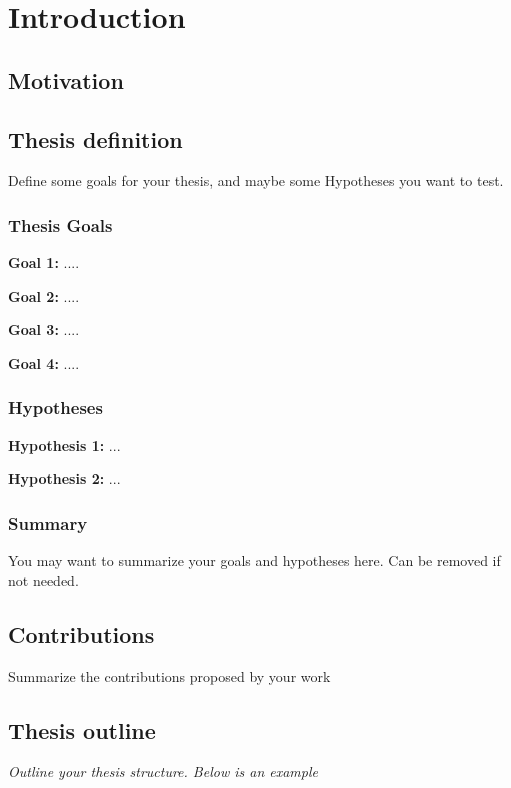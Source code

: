 \documentclass{uia}
\begin{document}
\chapter{Introduction}
\section{Motivation}

\section{Thesis definition}
\label{sec:intro:definition}
Define some goals for your thesis, and maybe some Hypotheses you want to test.
\subsection{Thesis Goals}

\textbf{Goal 1: } ....

\textbf{Goal 2: } ....

\textbf{Goal 3: } ....

\textbf{Goal 4: } ....

\subsection{Hypotheses}

\textbf{Hypothesis 1: } ...

\textbf{Hypothesis 2: } ...

\subsection{Summary}
You may want to summarize your goals and hypotheses here. Can be removed if not needed.

\section{Contributions}
Summarize the contributions proposed by your work 

\section{Thesis outline}
\textit{Outline your thesis structure. Below is an example}
\end{document}
